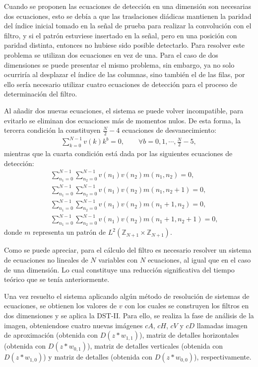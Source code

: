\par Cuando se proponen las ecuaciones de detecci\'on en una dimensi\'on son necesarias dos ecuaciones, esto se deb\'ia a que las traslaciones di\'adicas mantienen la paridad del \'indice inicial tomado en la se\~nal de prueba para realizar la convoluci\'on con el filtro, y si el patr\'on estuviese insertado en la se\~nal, pero en una posici\'on con paridad distinta, entonces no hubiese sido posible detectarlo. Para resolver este problema se utilizan dos ecuaciones en vez de una. Para el caso de dos dimensiones se puede presentar el mismo problema, sin embargo, ya no solo ocurrir\'ia al desplazar el \'indice de las columnas, sino tambi\'en el de las filas, por ello ser\'ia necesario utilizar cuatro ecuaciones de detecci\'on para el proceso de determinaci\'on del filtro.
\par Al a\~nadir dos nuevas ecuaciones, el sistema se puede volver incompatible, para evitarlo se eliminan dos ecuaciones m\'as de momentos nulos. De esta forma, la tercera condici\'on la constituyen $\frac{N}{2}-4$ ecuaciones de desvanecimiento:
\begin{eqnarray}
\sum_{k=0}^{N-1}v(k)k^b=0,\qquad\forall b=0,1,\cdots,\frac{N}{2}-5,\nonumber
\end{eqnarray}
mientras que la cuarta condici\'on est\'a dada por las siguientes ecuaciones de detecci\'on:
\begin{eqnarray}
&&\sum_{n_1=0}^{N-1}\sum_{n_2=0}^{N-1}v(n_1)v(n_2)m(n_1,n_2)=0,\nonumber\\
&&\sum_{n_1=0}^{N-1}\sum_{n_2=0}^{N-1}v(n_1)v(n_2)m(n_1,n_2+1)=0,\nonumber\\
&&\sum_{n_1=0}^{N-1}\sum_{n_2=0}^{N-1}v(n_1)v(n_2)m(n_1+1,n_2)=0,\nonumber\\
&&\sum_{n_1=0}^{N-1}\sum_{n_2=0}^{N-1}v(n_1)v(n_2)m(n_1+1,n_2+1)=0,\nonumber
\end{eqnarray}
donde $m$ representa un patr\'on de $L^2(\mathbb{Z}_{N+1}\times\mathbb{Z}_{N+1})$.\\

\par Como se puede apreciar, para el c\'alculo del filtro es necesario resolver un sistema de ecuaciones no lineales de $N$ variables con $N$ ecuaciones, al igual que en el caso de una dimensi\'on. Lo cual constituye una reducci\'on significativa del tiempo te\'orico que se ten\'ia anteriormente.\\

\par Una vez resuelto el sistema aplicando alg\'un m\'etodo de resoluci\'on de sistemas de ecuaciones, se obtienen los valores de $v$ con los cuales se construyen los filtros en dos dimensiones y se aplica la DST-II. Para ello, se realiza la fase de an\'alisis de la imagen, obteniendose cuatro nuevas im\'agenes $cA$, $cH$, $cV$ y $cD$ llamadas imagen de aproximaci\'on (obtenida con $D(z\ast w_{1,1})$), matriz de detalles horizontales (obtenida con $D(z\ast w_{0,1})$), matriz de detalles verticales (obtenida con $D(z\ast w_{1,0})$) y matriz de detalles (obtenida con $D(z\ast w_{0,0})$), respectivamente.

